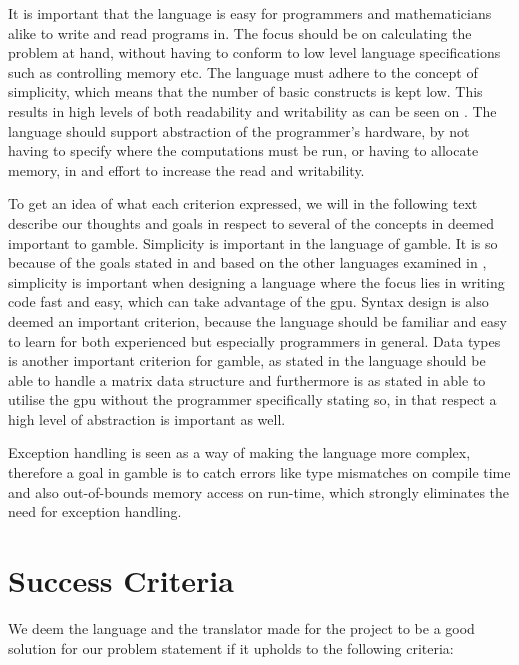 It is important that the language is easy for programmers and mathematicians alike to write and read programs in.
The focus should be on calculating the problem at hand, without having to conform to low level language specifications such as controlling memory etc.
The language must adhere to the concept of simplicity, which means that the number of basic constructs is kept low. 
This results in high levels of both readability and writability as can be seen on .
The language should support abstraction of the programmer's hardware, by not having to specify where the computations must be run, or having to allocate memory, in and effort to increase the read and writability. 

To get an idea of what each criterion expressed, we will in the following text describe our thoughts and goals in respect to several of the concepts in  deemed important to \gls{gamble}.
Simplicity is important in the language of \gls{gamble}.
It is so because of the goals stated in  and based on the other languages examined in , simplicity is important when designing a language where the focus lies in writing code fast and easy, which can take advantage of the \acrshort{gpu}.
Syntax design is also deemed an important criterion, because the language should be familiar and easy to learn for both experienced but especially programmers in general.
Data types is another important criterion for \gls{gamble}, as stated in  the language should be able to handle a matrix data structure and furthermore is as stated in  able to utilise the \acrshort{gpu} without the programmer specifically stating so, in that respect a high level of abstraction is important as well. 

Exception handling is seen as a way of making the language more complex, therefore a goal in \gls{gamble} is to catch errors like type mismatches on compile time and also out-of-bounds memory access on run-time, which strongly eliminates the need for exception handling.

\section{Success Criteria}\label{sec:OurCriterias}
We deem the language and the translator made for the project to be a good solution for our problem statement if it upholds to the following criteria:

